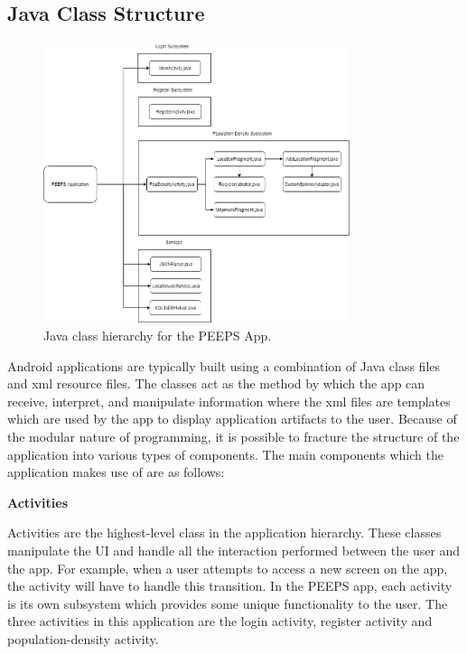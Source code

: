 \subsection{Java Class Structure}

\begin{figure}[ht]
    \centering
    \includegraphics[width=0.8\textwidth]{figures/ClassDiagram.png}
    \caption{Java class hierarchy for the PEEPS App.}
    \label{fig:class_diagram}
\end{figure}

Android applications are typically built using a combination of Java class files and xml resource files. The classes act as the method by which the app can receive, interpret, and manipulate information where the xml files are templates which are used by the app to display application artifacts to the user. Because of the modular nature of programming, it is possible to fracture the structure of the application into various types of components. The main components which the application makes use of are as follows:

\textbf{Activities}

Activities are the highest-level class in the application hierarchy. These classes manipulate the UI and handle all the interaction performed between the user and the app. For example, when a user attempts to access a new screen on the app, the activity will have to handle this transition. In the PEEPS app, each activity is its own subsystem which provides some unique functionality to the user. The three activities in this application are the login activity, register activity and population-density activity.

